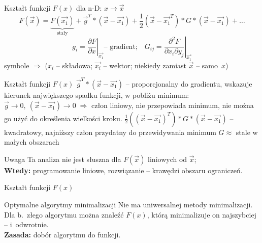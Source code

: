   \begin{frame}{Kształt funkcji $ F(x) $}
    dla n-D: $ x \to \vec{x} $
    \begin{displaymath}
      F(\vec{x}) = \underbrace{F(\vec{x_1})}_{\text{stały}} +
      \vec{g}^T * (\vec{x} - \vec{x_1}) +
      \frac{1}{2}(\vec{x} - \vec{x_1}^T) * G * (\vec{x} - \vec{x_1}) + \dots
    \end{displaymath}
    \begin{displaymath}
      g_i = \left. \frac{\partial F}{\partial x} \right|_{\vec{x_1}} \text{-- gradient;}\quad
      G_{ij} = \left. \frac{\partial^2 F}{\partial x_i \partial y_j} \right|_{\vec{x_1}}
    \end{displaymath}
    symbole $ \Rightarrow $ ($ x_i $ -- składowa; $ \vec{x_i} $
    -- wektor; niekiedy zamiast $ \vec{x} $ -- samo~$ x $)

  \end{frame}

  \begin{frame}{Kształt funkcji $ F(x) $}
    $ \vec{g}^T * (\vec{x} - \vec{x_1}) $ -- proporcjonalny do
    gradientu, wskazuje kierunek największego spadku funkcji,
    w pobliżu minimum: $ \vec{g} \to 0{,}\ (\vec{x} - \vec{x_1}) \to 0
    \; \Rightarrow $ człon liniowy, nie przepowiada minimum,
    nie można go użyć do określenia wielkości kroku.
    $ \frac{1}{2}((\vec{x} - \vec{x_1})^T) * G * (\vec{x} - \vec{x_1}) $
    -- kwadratowy, najniższy człon przydatny do przewidywania minimum
    $ G \approx $ stale w małych obszarach
    \begin{alertblock}{Uwaga}
      Ta analiza nie jest słuszna dla $ F(\vec{x}) $ liniowych
      od $ \vec{x} $;\\
      \textbf{Wtedy:} programowanie liniowe, rozwiązanie --
      krawędzi obszaru ograniczeń.
    \end{alertblock}
  \end{frame}

  \begin{frame}{Kształt funkcji $ F(x) $}
    \begin{block}{Optymalne algorytmy minimalizacji}
      Nie ma uniwersalnej metody minimalizacji. Dla b.~złego
      algorytmu można znaleźć $ F(x) $, którą minimalizuje on
      najszybciej -- i~odwrotnie.\\
      \textbf{Zasada:} dobór algorytmu do funkcji.

    \end{block}

  \end{frame}
